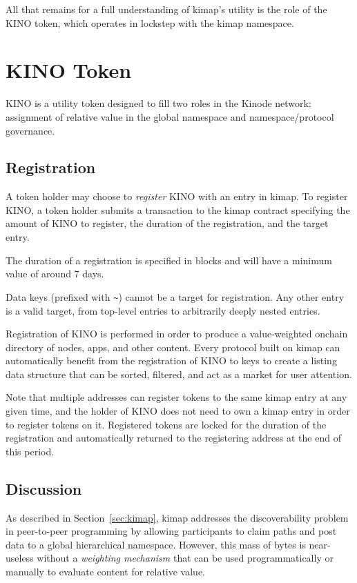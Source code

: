 \documentclass[runningheads]{llncs}
\begin{document}
All that remains for a full understanding of kimap's utility is the role of the KINO token, which operates in lockstep with the kimap namespace.

\section{KINO Token}
\label{sec:kino}

KINO is a utility token designed to fill two roles in the Kinode network: assignment of relative value in the global namespace and namespace/protocol governance.

\subsection{Registration}
\label{sec:kinoregister}

A token holder may choose to \textit{register} KINO with an entry in kimap.
To register KINO, a token holder submits a transaction to the kimap contract specifying the amount of KINO to register, the duration of the registration, and the target entry.

The duration of a registration is specified in blocks and will have a minimum value of around 7 days.

Data keys (prefixed with \verb|~|) cannot be a target for registration.
Any other entry is a valid target, from top-level entries to arbitrarily deeply nested entries.

Registration of KINO is performed in order to produce a value-weighted onchain directory of nodes, apps, and other content.
Every protocol built on kimap can automatically benefit from the registration of KINO to keys to create a listing data structure that can be sorted, filtered, and act as a market for user attention.

Note that multiple addresses can register tokens to the same kimap entry at any given time, and the holder of KINO does not need to own a kimap entry in order to register tokens on it.
Registered tokens are locked for the duration of the registration and automatically returned to the registering address at the end of this period.

\subsection{Discussion}
\label{sec:kinodiscussion}

As described in Section~\ref{sec:kimap}, kimap addresses the discoverability problem in peer-to-peer programming by allowing participants to claim paths and post data to a global hierarchical namespace.
However, this mass of bytes is near-useless without a \textit{weighting mechanism} that can be used programmatically or manually to evaluate content for relative value.
\end{document}
